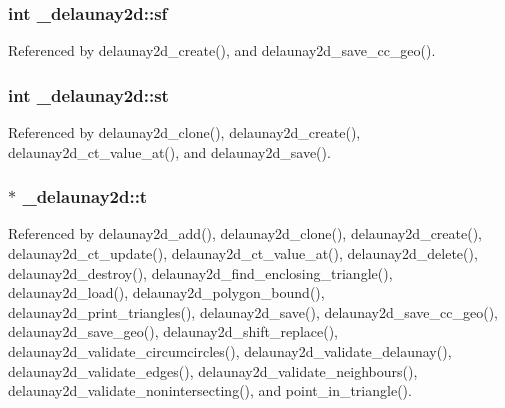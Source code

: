 \subsubsection[{\texorpdfstring{sf}{sf}}]{\setlength{\rightskip}{0pt plus 5cm}int \+\_\+delaunay2d\+::sf}\hypertarget{struct__delaunay2d_a96a3fa581638e23939315cc0b3c1a8cb}{}\label{struct__delaunay2d_a96a3fa581638e23939315cc0b3c1a8cb}


Referenced by delaunay2d\+\_\+create(), and delaunay2d\+\_\+save\+\_\+cc\+\_\+geo().

\subsubsection[{\texorpdfstring{st}{st}}]{\setlength{\rightskip}{0pt plus 5cm}int \+\_\+delaunay2d\+::st}\hypertarget{struct__delaunay2d_ab7dee2827d60562087f5abd1c9635462}{}\label{struct__delaunay2d_ab7dee2827d60562087f5abd1c9635462}


Referenced by delaunay2d\+\_\+clone(), delaunay2d\+\_\+create(), delaunay2d\+\_\+ct\+\_\+value\+\_\+at(), and delaunay2d\+\_\+save().

\subsubsection[{\texorpdfstring{t}{t}}]{$\ast$ \+\_\+delaunay2d\+::t}\hypertarget{struct__delaunay2d_af58f6fb997972b822e124155bad75b6c}{}\label{struct__delaunay2d_af58f6fb997972b822e124155bad75b6c}


Referenced by delaunay2d\+\_\+add(), delaunay2d\+\_\+clone(), delaunay2d\+\_\+create(), delaunay2d\+\_\+ct\+\_\+update(), delaunay2d\+\_\+ct\+\_\+value\+\_\+at(), delaunay2d\+\_\+delete(), delaunay2d\+\_\+destroy(), delaunay2d\+\_\+find\+\_\+enclosing\+\_\+triangle(), delaunay2d\+\_\+load(), delaunay2d\+\_\+polygon\+\_\+bound(), delaunay2d\+\_\+print\+\_\+triangles(), delaunay2d\+\_\+save(), delaunay2d\+\_\+save\+\_\+cc\+\_\+geo(), delaunay2d\+\_\+save\+\_\+geo(), delaunay2d\+\_\+shift\+\_\+replace(), delaunay2d\+\_\+validate\+\_\+circumcircles(), delaunay2d\+\_\+validate\+\_\+delaunay(), delaunay2d\+\_\+validate\+\_\+edges(), delaunay2d\+\_\+validate\+\_\+neighbours(), delaunay2d\+\_\+validate\+\_\+nonintersecting(), and point\+\_\+in\+\_\+triangle().

